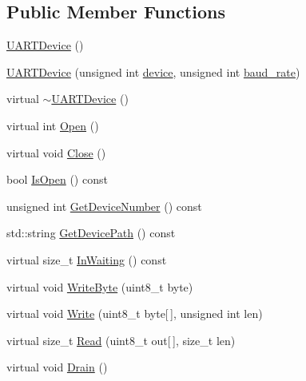 \subsection*{Public Member Functions}
\begin{DoxyCompactItemize}
\item 
\hyperlink{classcubesat_1_1UARTDevice_af648c63f795f89afac21d89352200a35}{U\+A\+R\+T\+Device} ()
\item 
\hyperlink{classcubesat_1_1UARTDevice_afe892b54ee594ad24c4d89239717deab}{U\+A\+R\+T\+Device} (unsigned int \hyperlink{classcubesat_1_1UARTDevice_a19a4104e3e06e3d76a4ea7c2c3ee26ad}{device}, unsigned int \hyperlink{classcubesat_1_1UARTDevice_ab5c12926f749e9bbcae638cd973f8d6f}{baud\+\_\+rate})
\item 
virtual \hyperlink{classcubesat_1_1UARTDevice_a2d29c9d257d0bccd37ed1a46d677fd59}{$\sim$\+U\+A\+R\+T\+Device} ()
\item 
virtual int \hyperlink{classcubesat_1_1UARTDevice_a0aecca41c50292d1fe1707047d358b3c}{Open} ()
\item 
virtual void \hyperlink{classcubesat_1_1UARTDevice_a4f98d284474caac32b0ec06ce8b74c3c}{Close} ()
\item 
bool \hyperlink{classcubesat_1_1UARTDevice_ac2f32d0a2afeec8d86c61bfc110eb2f1}{Is\+Open} () const
\item 
unsigned int \hyperlink{classcubesat_1_1UARTDevice_a20e25102be5f18fff292a4078d9683a3}{Get\+Device\+Number} () const
\item 
std\+::string \hyperlink{classcubesat_1_1UARTDevice_a703a5c7bbfde9765313f2f4c4c41858b}{Get\+Device\+Path} () const
\item 
virtual size\+\_\+t \hyperlink{classcubesat_1_1UARTDevice_a0b1b192b77a10db5971d95bea86a2f75}{In\+Waiting} () const
\item 
virtual void \hyperlink{classcubesat_1_1UARTDevice_a647e8d0903bfbde3b68d88ce51cac8b3}{Write\+Byte} (uint8\+\_\+t byte)
\item 
virtual void \hyperlink{classcubesat_1_1UARTDevice_a3e951a7949b46db693bfff5b31a185b5}{Write} (uint8\+\_\+t byte\mbox{[}$\,$\mbox{]}, unsigned int len)
\item 
virtual size\+\_\+t \hyperlink{classcubesat_1_1UARTDevice_acf792566e68c57746e0dd48d091092ac}{Read} (uint8\+\_\+t out\mbox{[}$\,$\mbox{]}, size\+\_\+t len)
\item 
virtual void \hyperlink{classcubesat_1_1UARTDevice_aa1b4f804458d976a8e3c1a5f69db31af}{Drain} ()
\end{DoxyCompactItemize}
